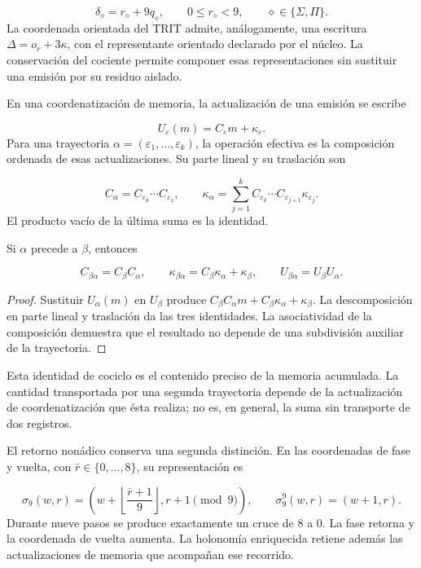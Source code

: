 \[
\delta_\diamond=r_\diamond+9q_\diamond,
\qquad 0\leq r_\diamond<9,
\qquad \diamond\in\{\Sigma,\Pi\}.
\]
La coordenada orientada del TRIT admite, análogamente, una escritura \(\Delta=o_r+3\kappa\), con el representante orientado declarado por el núcleo. La conservación del cociente permite componer esas representaciones sin sustituir una emisión por su residuo aislado.

En una coordenatización de memoria, la actualización de una emisión se escribe

\[
U_\varepsilon(m)=C_\varepsilon m+\kappa_\varepsilon.
\]
Para una trayectoria \(\alpha=(\varepsilon_1,\ldots,\varepsilon_k)\), la operación efectiva es la composición ordenada de esas actualizaciones. Su parte lineal y su traslación son

\[
C_\alpha=C_{\varepsilon_k}\cdots C_{\varepsilon_1},
\qquad
\kappa_\alpha=
\sum_{j=1}^{k}C_{\varepsilon_k}\cdots
C_{\varepsilon_{j+1}}\kappa_{\varepsilon_j}.
\]
El producto vacío de la última suma es la identidad.

\begin{proposition}
\label{act21:prop:continuo-compatibilidad-afin}
Si \(\alpha\) precede a \(\beta\), entonces

\[
C_{\beta\alpha}=C_\beta C_\alpha,
\qquad
\kappa_{\beta\alpha}=C_\beta\kappa_\alpha+\kappa_\beta,
\qquad
U_{\beta\alpha}=U_\beta U_\alpha.
\]
\end{proposition}
\begin{proof}
Sustituir \(U_\alpha(m)\) en \(U_\beta\) produce \(C_\beta C_\alpha m+C_\beta\kappa_\alpha+\kappa_\beta\). La descomposición en parte lineal y traslación da las tres identidades. La asociatividad de la composición demuestra que el resultado no depende de una subdivisión auxiliar de la trayectoria.
\end{proof}

Esta identidad de cociclo es el contenido preciso de la memoria acumulada. La cantidad transportada por una segunda trayectoria depende de la actualización de coordenatización que ésta realiza; no es, en general, la suma sin transporte de dos registros.

El retorno nonádico conserva una segunda distinción. En las coordenadas de fase y vuelta, con \(\bar r\in\{0,\ldots,8\}\), su representación es

\[
\sigma_9(w,r)=
\left(w+\left\lfloor\frac{\bar r+1}{9}\right\rfloor,
r+1\pmod9\right),
\qquad
\sigma_9^9(w,r)=(w+1,r).
\]
Durante nueve pasos se produce exactamente un cruce de \(8\) a \(0\). La fase retorna y la coordenada de vuelta aumenta. La holonomía enriquecida retiene además las actualizaciones de memoria que acompañan ese recorrido.

